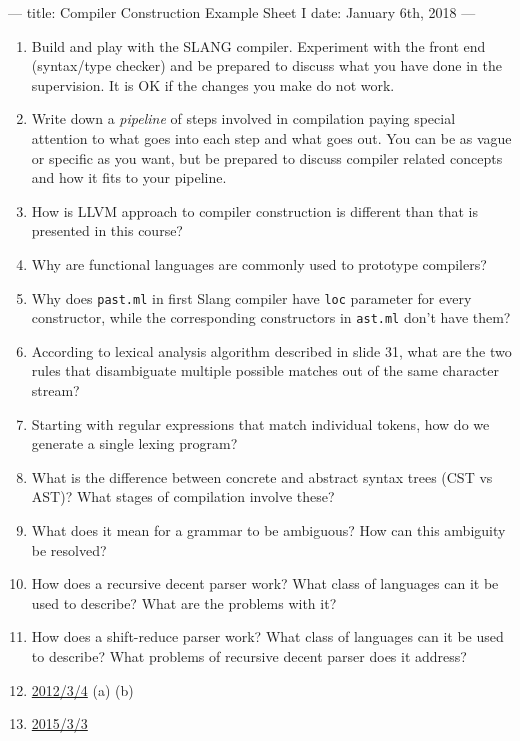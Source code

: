 ---
title: Compiler Construction Example Sheet I
date: January 6th, 2018
---



\begin{enumerate}
  \item Build and play with the SLANG compiler. Experiment with the front end
    (syntax/type checker) and be prepared to discuss what you have done in the
    supervision. It is OK if the changes you make do not work.

  \item Write down a \emph{pipeline} of steps involved in compilation paying
    special attention to what goes into each step and what goes out. You can be
    as vague or specific as you want, but be prepared to discuss compiler
    related concepts and how it fits to your pipeline.

  \item How is \textsc{LLVM} approach to compiler construction is different
    than that is presented in this course?

  \item Why are functional languages are commonly used to prototype compilers?

  \item Why does \texttt{past.ml} in first Slang compiler have \texttt{loc}
    parameter for every constructor, while the corresponding constructors in
    \texttt{ast.ml} don't have them?

  \item According to lexical analysis algorithm described in slide 31, what are
    the two rules that disambiguate multiple possible matches out of the same
    character stream?

  \item Starting with regular expressions that match individual tokens, how do
    we generate a single lexing program?

  \item What is the difference between concrete and abstract syntax trees (CST
    vs AST)? What stages of compilation involve these?

  \item What does it mean for a grammar to be ambiguous? How can this ambiguity
    be resolved?

  \item How does a recursive decent parser work? What class of languages can it
    be used to describe? What are the problems with it?

  \item How does a shift-reduce parser work? What class of languages can it be
    used to describe? What problems of recursive decent parser does it address?

  \item \href{http://www.cl.cam.ac.uk/teaching/exams/pastpapers/y2012p3q4.pdf}{2012/3/4} (a) (b)

  \item \href{http://www.cl.cam.ac.uk/teaching/exams/pastpapers/y2015p3q3.pdf}{2015/3/3}
\end{enumerate}


